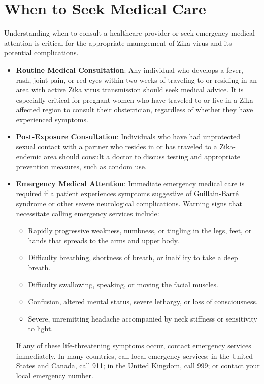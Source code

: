\section*{When to Seek Medical Care}
Understanding when to consult a healthcare provider or seek emergency medical attention is critical for the appropriate management of Zika virus and its potential complications.
\begin{itemize}
\item \textbf{Routine Medical Consultation}: Any individual who develops a fever, rash, joint pain, or red eyes within two weeks of traveling to or residing in an area with active Zika virus transmission should seek medical advice. It is especially critical for pregnant women who have traveled to or live in a Zika-affected region to consult their obstetrician, regardless of whether they have experienced symptoms.
\item \textbf{Post-Exposure Consultation}: Individuals who have had unprotected sexual contact with a partner who resides in or has traveled to a Zika-endemic area should consult a doctor to discuss testing and appropriate prevention measures, such as condom use.
\item \textbf{Emergency Medical Attention}: Immediate emergency medical care is required if a patient experiences symptoms suggestive of Guillain-Barr\'e syndrome or other severe neurological complications. Warning signs that necessitate calling emergency services include:
  \begin{itemize}
  \item Rapidly progressive weakness, numbness, or tingling in the legs, feet, or hands that spreads to the arms and upper body.
  \item Difficulty breathing, shortness of breath, or inability to take a deep breath.
  \item Difficulty swallowing, speaking, or moving the facial muscles.
  \item Confusion, altered mental status, severe lethargy, or loss of consciousness.
  \item Severe, unremitting headache accompanied by neck stiffness or sensitivity to light.
  \end{itemize}
If any of these life-threatening symptoms occur, contact emergency services immediately. In many countries, call local emergency services; in the United States and Canada, call 911; in the United Kingdom, call 999; or contact your local emergency number.
\end{itemize}

